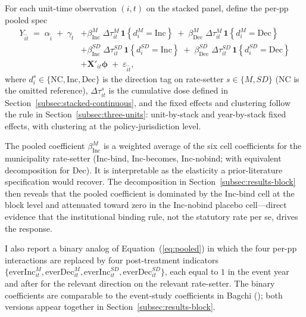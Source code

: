 \documentclass[12pt]{article}
\begin{document}
For each unit-time observation $(i, t)$ on the stacked panel, define
the per-pp pooled spec
\begin{equation}
\begin{split}
Y_{\tilde i \tilde t} \;=\; \alpha_{\tilde i} \;+\; \gamma_{\tilde t}
&+ \beta^{M}_{\text{Inc}}\;\Delta\tau^{M}_{it}\,\mathbf{1}\!\left\{d^{M}_{i} = \text{Inc}\right\}
\;+\; \beta^{M}_{\text{Dec}}\;\Delta\tau^{M}_{it}\,\mathbf{1}\!\left\{d^{M}_{i} = \text{Dec}\right\} \\
&+ \beta^{SD}_{\text{Inc}}\;\Delta\tau^{SD}_{it}\,\mathbf{1}\!\left\{d^{SD}_{i} = \text{Inc}\right\}
\;+\; \beta^{SD}_{\text{Dec}}\;\Delta\tau^{SD}_{it}\,\mathbf{1}\!\left\{d^{SD}_{i} = \text{Dec}\right\} \\
&+ \mathbf{X}'_{it}\boldsymbol{\phi}
\;+\; \varepsilon_{\tilde i \tilde t},
\end{split}
\label{eq:pooled}
\end{equation}
where $d^{s}_{i} \in \{\text{NC}, \text{Inc}, \text{Dec}\}$ is the
direction tag on rate-setter $s \in \{M, SD\}$ (NC is the omitted reference),
$\Delta\tau^{s}_{it}$ is the cumulative dose defined in
Section~\ref{subsec:stacked-continuous}, and the fixed effects and
clustering follow the rule in
Section~\ref{subsec:three-units}: unit-by-stack and year-by-stack
fixed effects, with clustering at the policy-jurisdiction level.

The pooled coefficient $\beta^{M}_{\text{Inc}}$ is a weighted average
of the six cell coefficients for the municipality rate-setter
(Inc-bind, Inc-becomes, Inc-nobind; with equivalent decomposition for
Dec). It is interpretable as the elasticity a prior-literature
specification would recover. The decomposition in
Section~\ref{subsec:results-block} then reveals that the pooled
coefficient is dominated by the Inc-bind cell at the block level and
attenuated toward zero in the Inc-nobind placebo cell---direct evidence
that the institutional binding rule, not the statutory rate per
se, drives the response.

I also report a binary analog of Equation~(\ref{eq:pooled}) in
which the four per-pp interactions are replaced by four
post-treatment indicators
$\{\mathrm{everInc}^{M}_{it}, \mathrm{everDec}^{M}_{it},
\mathrm{everInc}^{SD}_{it}, \mathrm{everDec}^{SD}_{it}\}$, each equal
to $1$ in the event year and after for the relevant direction on the
relevant rate-setter. The binary coefficients are comparable to the
event-study coefficients in Bagchi
(\citeyear{bagchiEffectsIntroducingWithholding2022}); both versions
appear together in Section~\ref{subsec:results-block}.
\end{document}
